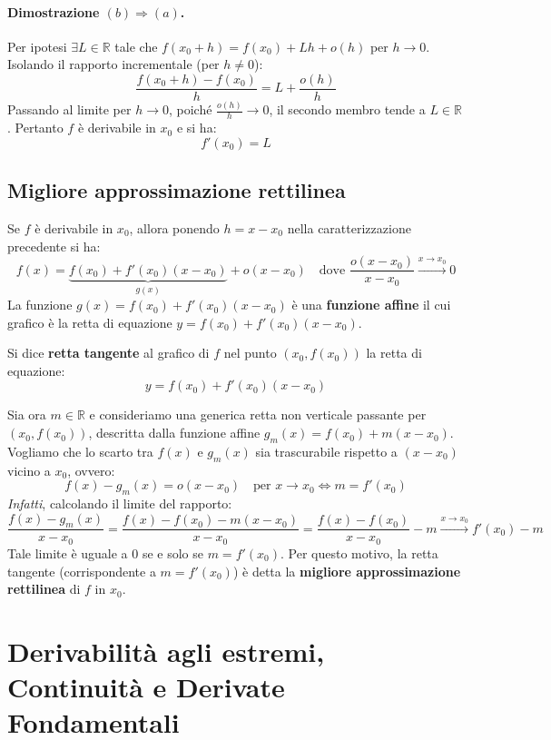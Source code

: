 \paragraph{Dimostrazione $(b) \Rightarrow (a)$.}
Per ipotesi $\exists L \in \mathbb{R}$ tale che $f(x_0 + h) = f(x_0) + Lh + o(h)$ per $h \to 0$. Isolando il rapporto incrementale (per $h \neq 0$):
\[
\frac{f(x_0 + h) - f(x_0)}{h} = L + \frac{o(h)}{h}
\]
Passando al limite per $h \to 0$, poiché $\frac{o(h)}{h} \to 0$, il secondo membro tende a $L \in \mathbb{R}$. Pertanto $f$ è derivabile in $x_0$ e si ha:
\[
f'(x_0) = L
\]

\subsection{Migliore approssimazione rettilinea}

Se $f$ è derivabile in $x_0$, allora ponendo $h = x - x_0$ nella caratterizzazione precedente si ha:
\[
f(x) = \underbrace{f(x_0) + f'(x_0)(x - x_0)}_{g(x)} + o(x - x_0) \quad \text{dove } \frac{o(x - x_0)}{x - x_0} \xrightarrow{x \to x_0} 0
\]
La funzione $g(x) = f(x_0) + f'(x_0)(x - x_0)$ è una \textbf{funzione affine} il cui grafico è la retta di equazione $y = f(x_0) + f'(x_0)(x - x_0)$.

\begin{defbox}
Si dice \textbf{retta tangente} al grafico di $f$ nel punto $(x_0, f(x_0))$ la retta di equazione:
\[
y = f(x_0) + f'(x_0)(x - x_0)
\]
\end{defbox}

Sia ora $m \in \mathbb{R}$ e consideriamo una generica retta non verticale passante per $(x_0, f(x_0))$, descritta dalla funzione affine $g_m(x) = f(x_0) + m(x - x_0)$. Vogliamo che lo scarto tra $f(x)$ e $g_m(x)$ sia trascurabile rispetto a $(x - x_0)$ vicino a $x_0$, ovvero:
\[
f(x) - g_m(x) = o(x - x_0) \quad \text{per } x \to x_0 \iff m = f'(x_0)
\]
\textit{Infatti}, calcolando il limite del rapporto:
\[
\frac{f(x) - g_m(x)}{x - x_0} = \frac{f(x) - f(x_0) - m(x - x_0)}{x - x_0} = \frac{f(x) - f(x_0)}{x - x_0} - m \xrightarrow{x \to x_0} f'(x_0) - m
\]
Tale limite è uguale a $0$ se e solo se $m = f'(x_0)$. Per questo motivo, la retta tangente (corrispondente a $m = f'(x_0)$) è detta la \textbf{migliore approssimazione rettilinea} di $f$ in $x_0$.

\section{Derivabilità agli estremi, Continuità e Derivate Fondamentali}

